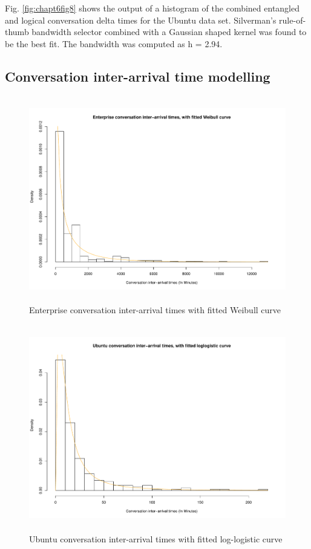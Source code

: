 Fig. \ref{fig:chapt6fig8} shows the output of a histogram of the combined entangled and logical conversation delta times for the Ubuntu data set. Silverman's rule-of-thumb bandwidth selector combined with a Gaussian shaped kernel was found to be the best fit.  The bandwidth was computed as h = 2.94.


\subsection{Conversation inter-arrival time modelling}

\begin{figure}
\begin{center}
\caption{Enterprise conversation inter-arrival times with fitted Weibull curve}
\label{fig:chapt6fig9}
\includegraphics[height=9cm, width=13cm]{graphs/different/09_interarrival_enterprise.pdf} 
\end{center}
\end{figure}

\begin{figure}
\begin{center}
\caption{Ubuntu conversation inter-arrival times with fitted log-logistic curve}
\label{fig:chapt6fig10}
\includegraphics[height=9cm, width=13cm]{graphs/different/10_interarrival_ubuntu.pdf} 
\end{center}
\end{figure}


